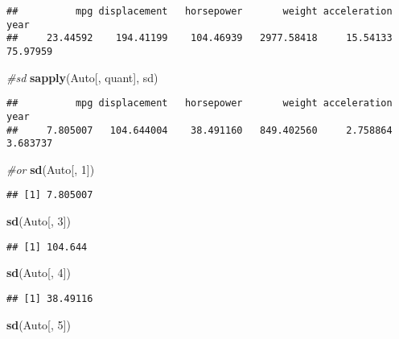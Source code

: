 \documentclass[
]{article}
\newenvironment{Shaded}{\begin{snugshade}}{\end{snugshade}}
\newcommand{\CommentTok}[1]{\textcolor[rgb]{0.56,0.35,0.01}{\textit{#1}}}
\newcommand{\DecValTok}[1]{\textcolor[rgb]{0.00,0.00,0.81}{#1}}
\newcommand{\FunctionTok}[1]{\textcolor[rgb]{0.13,0.29,0.53}{\textbf{#1}}}
\newcommand{\NormalTok}[1]{#1}
\begin{document}
\begin{verbatim}
##          mpg displacement   horsepower       weight acceleration         year 
##     23.44592    194.41199    104.46939   2977.58418     15.54133     75.97959
\end{verbatim}

\begin{Shaded}
\begin{Highlighting}[]
\CommentTok{\#sd}
\FunctionTok{sapply}\NormalTok{(Auto[, quant], sd)}
\end{Highlighting}
\end{Shaded}

\begin{verbatim}
##          mpg displacement   horsepower       weight acceleration         year 
##     7.805007   104.644004    38.491160   849.402560     2.758864     3.683737
\end{verbatim}

\begin{Shaded}
\begin{Highlighting}[]
\CommentTok{\#or}
\FunctionTok{sd}\NormalTok{(Auto[, }\DecValTok{1}\NormalTok{])}
\end{Highlighting}
\end{Shaded}

\begin{verbatim}
## [1] 7.805007
\end{verbatim}

\begin{Shaded}
\begin{Highlighting}[]
\FunctionTok{sd}\NormalTok{(Auto[, }\DecValTok{3}\NormalTok{])}
\end{Highlighting}
\end{Shaded}

\begin{verbatim}
## [1] 104.644
\end{verbatim}

\begin{Shaded}
\begin{Highlighting}[]
\FunctionTok{sd}\NormalTok{(Auto[, }\DecValTok{4}\NormalTok{])}
\end{Highlighting}
\end{Shaded}

\begin{verbatim}
## [1] 38.49116
\end{verbatim}

\begin{Shaded}
\begin{Highlighting}[]
\FunctionTok{sd}\NormalTok{(Auto[, }\DecValTok{5}\NormalTok{])}
\end{Highlighting}
\end{Shaded}
\end{document}
